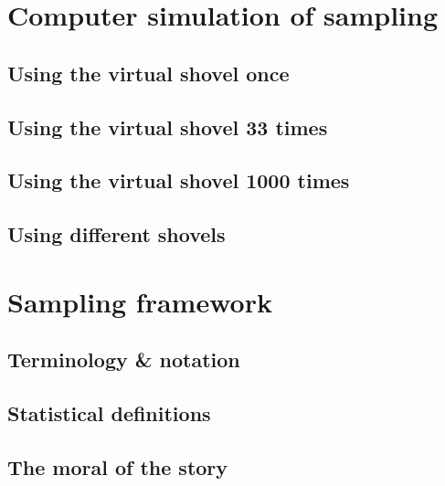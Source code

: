 \documentclass[
  12pt, krantz2,
]{krantz}
\begin{document}
\hypertarget{sampling-simulation}{%
\section{Computer simulation of sampling}\label{sampling-simulation}}

\hypertarget{using-the-virtual-shovel-once}{%
\subsection{Using the virtual shovel once}\label{using-the-virtual-shovel-once}}

\hypertarget{using-the-virtual-shovel-33-times}{%
\subsection{Using the virtual shovel 33 times}\label{using-the-virtual-shovel-33-times}}

\hypertarget{shovel-1000-times}{%
\subsection{Using the virtual shovel 1000 times}\label{shovel-1000-times}}

\hypertarget{different-shovels}{%
\subsection{Using different shovels}\label{different-shovels}}

\hypertarget{sampling-framework}{%
\section{Sampling framework}\label{sampling-framework}}

\hypertarget{terminology-and-notation}{%
\subsection{Terminology \& notation}\label{terminology-and-notation}}

\hypertarget{statistical-definitions}{%
\subsection{Statistical definitions}\label{statistical-definitions}}

\hypertarget{the-moral-of-the-story}{%
\subsection{The moral of the story}\label{the-moral-of-the-story}}
\end{document}

